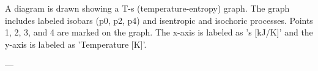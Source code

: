 A diagram is drawn showing a T-s (temperature-entropy) graph. The graph includes labeled isobars (p0, p2, p4) and isentropic and isochoric processes. Points 1, 2, 3, and 4 are marked on the graph. The x-axis is labeled as 's [kJ/K]' and the y-axis is labeled as 'Temperature [K]'.

---